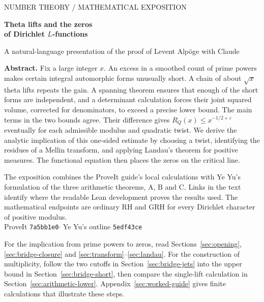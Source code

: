\documentclass[11pt,letterpaper]{article}
\begin{document}
\thispagestyle{empty}
{\small\sffamily\color{ocean} NUMBER THEORY \quad / \quad MATHEMATICAL EXPOSITION}\par
\vspace{.55in}
{\fontsize{31}{36}\selectfont\bfseries\color{ink}Theta lifts and the zeros\\of Dirichlet \(L\)-functions\par}
\vspace{.18in}
{\large A natural-language presentation of the proof of Levent Alpöge with Claude\par}
\vspace{.14in}
\noindent\textbf{Abstract.}
Fix a large integer \(x\). An excess in a smoothed count of prime powers makes certain integral automorphic forms unusually short. A chain of about \(\sqrt{x}\) theta lifts repeats the gain. A spanning theorem ensures that enough of the short forms are independent, and a determinant calculation forces their joint squared volume, corrected for denominators, to exceed a precise lower bound. The main terms in the two bounds agree. Their difference gives \(R_Q(x)\le x^{-1/2+\varepsilon}\) eventually for each admissible modulus and quadratic twist. We derive the analytic implication of this one-sided estimate by choosing a twist, identifying the residues of a Mellin transform, and applying Landau's theorem for positive measures. The functional equation then places the zeros on the critical line.
\par\vspace{.12in}
\noindent The exposition combines the ProveIt guide's local calculations with Ye Yu's formulation of the three arithmetic theorems, A, B and C. Links in the text identify where the readable Lean development proves the results used. The mathematical endpoints are ordinary RH and GRH for every Dirichlet character of positive modulus.
\vfill
{}\\[3pt]
{\small ProveIt \texttt{7a5bb1e0}\quad $\cdot$ \quad Ye Yu's outline \texttt{5edf43ce}}
\clearpage
\tableofcontents
\bigskip
{}\par
\noindent For the implication from prime powers to zeros, read Sections~\ref{sec:opening}, \ref{sec:bridge-closure} and \ref{sec:transform}--\ref{sec:landau}. For the construction of multiplicity, follow the two cutoffs in Section~\ref{sec:bridge-jets} into the upper bound in Section~\ref{sec:bridge-short}, then compare the single-lift calculation in Section~\ref{sec:arithmetic-lower}. Appendix~\ref{sec:worked-guide} gives finite calculations that illustrate these steps.
\clearpage






\appendix


\end{document}

